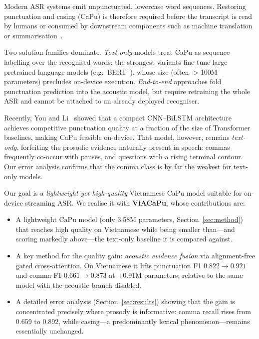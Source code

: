 \documentclass[conference]{IEEEtran}
\begin{document}
Modern ASR systems emit unpunctuated, lowercase word sequences. Restoring
punctuation and casing (CaPu) is therefore required before the transcript is read
by humans or consumed by downstream components such as machine translation or
summarisation~\cite{survey}.

Two solution families dominate. \emph{Text-only} models treat CaPu as sequence
labelling over the recognised words; the strongest variants fine-tune large
pretrained language models (e.g.\ BERT~\cite{bertpunct}), whose size (often
$>$100M parameters) precludes on-device execution. \emph{End-to-end} approaches fold punctuation prediction into
the acoustic model, but require retraining the whole ASR and cannot be attached to
an already deployed recogniser.

Recently, You and Li~\cite{you2024lightweight} showed that a compact CNN--BiLSTM
architecture achieves competitive punctuation quality at a fraction of the size of
Transformer baselines, making CaPu feasible on-device. That model, however, remains
\emph{text-only}, forfeiting the prosodic evidence naturally present in speech:
commas frequently co-occur with pauses, and questions with a rising terminal
contour. Our error analysis confirms that the comma class is by far the weakest for
text-only models.

Our goal is a \emph{lightweight yet high-quality} Vietnamese CaPu model suitable
for on-device streaming ASR. We realise it with \textbf{ViACaPu}, whose
contributions are:

\begin{itemize}
\item A lightweight CaPu model (only 3.58M parameters, Section~\ref{sec:method})
      that reaches high quality on Vietnamese while being smaller than---and
      scoring markedly above---the text-only baseline it is compared against.
\item A key method for the quality gain: \emph{acoustic evidence fusion} via
      alignment-free gated cross-attention. On Vietnamese it lifts punctuation F1
      $0.822 \rightarrow 0.921$ and comma F1 $0.661 \rightarrow 0.873$ at
      $+0.91$M parameters, relative to the same model with the acoustic branch
      disabled.
\item A detailed error analysis (Section~\ref{sec:results}) showing that the gain
      is concentrated precisely where prosody is informative: comma recall rises
      from 0.659 to 0.892, while casing---a predominantly lexical
      phenomenon---remains essentially unchanged.
\end{itemize}
\end{document}
